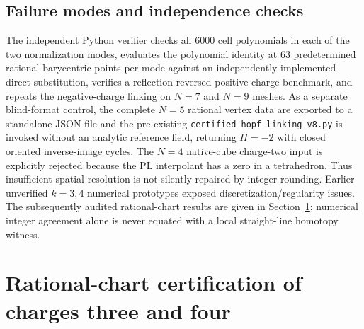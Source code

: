 \documentclass[aps,prd,onecolumn,notitlepage,11pt,superscriptaddress,longbibliography]{revtex4-2}
\begin{document}
\subsection{Failure modes and independence checks}
The independent Python verifier checks all $6000$ cell polynomials in each of the two normalization modes, evaluates the polynomial identity at $63$ predetermined rational barycentric points per mode against an independently implemented direct substitution, verifies a reflection-reversed positive-charge benchmark, and repeats the negative-charge linking on $N=7$ and $N=9$ meshes. As a separate blind-format control, the complete $N=5$ rational vertex data are exported to a standalone JSON file and the pre-existing \texttt{certified\_hopf\_linking\_v8.py} is invoked without an analytic reference field, returning $H=-2$ with closed oriented inverse-image cycles. The $N=4$ native-cube charge-two input is explicitly rejected because the PL interpolant has a zero in a tetrahedron. Thus insufficient spatial resolution is not silently repaired by integer rounding. Earlier unverified $k=3,4$ numerical prototypes exposed discretization/regularity issues. The subsequently audited rational-chart results are given in Section~\ref{sec:v10higher}; numerical integer agreement alone is never equated with a local straight-line homotopy witness.


\section{Rational-chart certification of charges three and four}\label{sec:v10higher}
\end{document}
